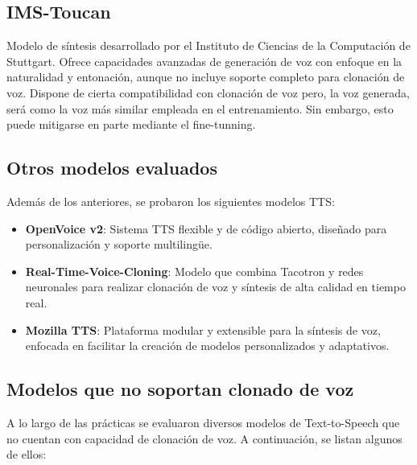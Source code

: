 \subsection{IMS-Toucan}\label{subsec:ims_toucan}
Modelo\cite{ims_toucan} de síntesis desarrollado por el Instituto de Ciencias de la Computación de Stuttgart. Ofrece capacidades avanzadas de generación de voz con enfoque en la naturalidad y entonación, aunque no incluye soporte completo para clonación de voz. Dispone de cierta compatibilidad con clonación de voz pero, la voz generada, será como la voz más similar empleada en el entrenamiento. Sin embargo, esto puede mitigarse en parte mediante el fine-tunning.

\subsection{Otros modelos evaluados}\label{subsec:other_models}
Además de los anteriores, se probaron los siguientes modelos TTS:

\begin{itemize}
    \item \textbf{OpenVoice v2}: Sistema\cite{openvoice} TTS flexible y de código abierto, diseñado para personalización y soporte multilingüe.
    \item \textbf{Real-Time-Voice-Cloning}: Modelo que combina Tacotron y redes neuronales para realizar clonación de voz y síntesis de alta calidad en tiempo real.
    \item \textbf{Mozilla TTS}: Plataforma\cite{mozilla_tts} modular y extensible para la síntesis de voz, enfocada en facilitar la creación de modelos personalizados y adaptativos.
\end{itemize}

\subsection{Modelos que no soportan clonado de voz}\label{subsec:no_clonado}

A lo largo de las prácticas se evaluaron diversos modelos de Text-to-Speech que no cuentan con capacidad de clonación de voz. A continuación, se listan algunos de ellos:

